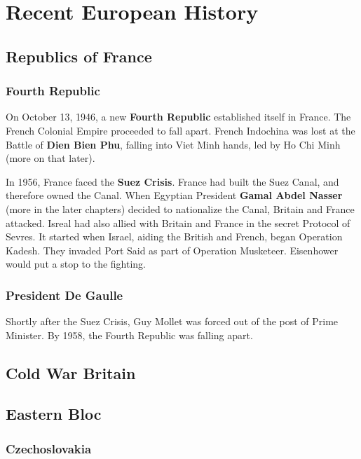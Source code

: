 \chapter{Recent European History}

\section{Republics of France}

\subsection*{Fourth Republic}

On October 13, 1946, a new \textbf{Fourth Republic} established itself in France.
The French Colonial Empire proceeded to fall apart.
French Indochina was lost at the Battle of \textbf{Dien Bien Phu},
falling into Viet Minh hands, led by Ho Chi Minh (more on that later).

In 1956, France faced the \textbf{Suez Crisis}.
France had built the Suez Canal, and therefore owned the Canal.
When Egyptian President \textbf{Gamal Abdel Nasser} (more in the later chapters)
decided to nationalize the Canal, Britain and France attacked.
Isreal had also allied with Britain and France in the secret Protocol of Sevres.
It started when Israel, aiding the British and French, began Operation Kadesh.
They invaded Port Said as part of Operation Musketeer.
Eisenhower would put a stop to the fighting.

\subsection*{President De Gaulle}

Shortly after the Suez Crisis, Guy Mollet was forced out of the post of Prime Minister.
By 1958, the Fourth Republic was falling apart.

\section{Cold War Britain}

\section{Eastern Bloc}

\subsection*{Czechoslovakia}


